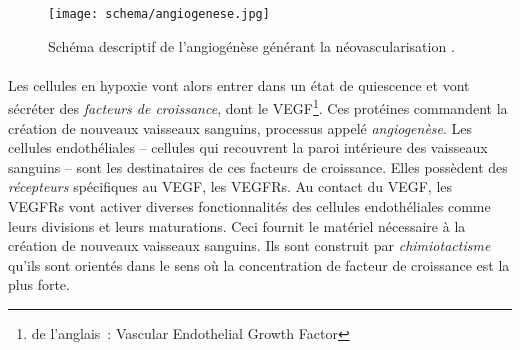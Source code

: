 \documentclass[main.tex]{subfiles}
\begin{document}
\begin{wrapfigure}[26]{O}{.62\textwidth}
\vspace{10mm}
\texttt{[image: schema/angiogenese.jpg]}
\caption{\label{fig:schema_angio} Schéma descriptif de l'angiogénèse générant la néovascularisation \cite{webangiogenese}.}
\end{wrapfigure}


\paragraph{}
Les cellules en hypoxie vont alors entrer dans un état de quiescence et vont sécréter des \emph{facteurs de croissance}, dont le VEGF\footnote{de l'anglais~: Vascular Endothelial Growth Factor}. 
Ces protéines commandent la création de nouveaux vaisseaux  
 sanguins, processus appelé \emph{angiogenèse}. 
Les cellules endothéliales -- cellules qui recouvrent la paroi intérieure des vaisseaux sanguins -- sont les destinataires de ces facteurs de croissance. 
Elles possèdent des \emph{récepteurs} spécifiques au VEGF, les VEGFRs. 
Au contact du VEGF, les VEGFRs vont activer diverses fonctionnalités des cellules endothéliales comme leurs divisions et leurs maturations. 
Ceci fournit le matériel nécessaire à la création de nouveaux vaisseaux sanguins. 
Ils sont construit par \emph{chimiotactisme} \cad qu'ils sont 
 orientés dans le sens où la concentration de facteur de croissance est la plus forte. 
\end{document}
